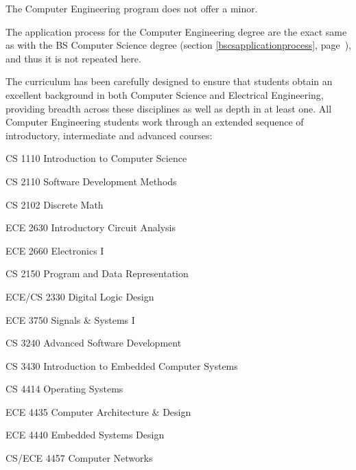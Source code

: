 The Computer Engineering program does not offer a minor.


\label{bscpeapplicationprocess}

The application process for the Computer Engineering degree are the
exact same as with the BS Computer Science degree (section
\ref{bscsapplicationprocess}, page~\pageref{bscsapplicationprocess}),
and thus it is not repeated here.



The curriculum has been carefully designed to ensure that students
obtain an excellent background in both Computer Science and Electrical
Engineering, providing breadth across these disciplines as well as
depth in at least one. All Computer Engineering students work through
an extended sequence of introductory, intermediate and advanced
courses:

\begin{itemlist}
\item CS 1110 Introduction to Computer Science
\item CS 2110 Software Development Methods
\item CS 2102 Discrete Math
\item ECE 2630 Introductory Circuit Analysis
\item ECE 2660 Electronics I
\item CS 2150 Program and Data Representation
\item ECE/CS 2330 Digital Logic Design
\item ECE 3750 Signals \& Systems I
\item CS 3240 Advanced Software Development
\item CS 3430 Introduction to Embedded Computer Systems
\item CS 4414 Operating Systems
\item ECE 4435 Computer Architecture \& Design
\item ECE 4440 Embedded Systems Design
\item CS/ECE 4457 Computer Networks
\end{itemlist}


